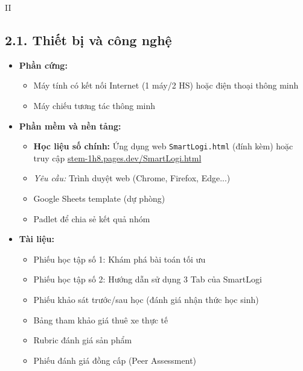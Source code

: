 \documentclass[12pt,a4paper]{article}
\begin{document}
\begin{competitionsection}{II}
\vspace{0.5cm}
\subsection*{2.1. Thiết bị và công nghệ}
\begin{itemize}[leftmargin=*,noitemsep]
\item \textbf{Phần cứng:}
    \begin{itemize}
    \item Máy tính có kết nối Internet (1 máy/2 HS) hoặc điện thoại thông minh
    \item Máy chiếu tương tác thông minh
    \end{itemize}
\item \textbf{Phần mềm và nền tảng:}
    \begin{itemize}
    \item \textbf{Học liệu số chính:} Ứng dụng web \texttt{SmartLogi.html} (đính kèm) hoặc truy cập \href{https://stem-1h8.pages.dev/SmartLogi.html}{stem-1h8.pages.dev/SmartLogi.html}
    \item \textit{Yêu cầu:} Trình duyệt web (Chrome, Firefox, Edge...)
    \item Google Sheets template (dự phòng)
    \item Padlet để chia sẻ kết quả nhóm
    \end{itemize}
\item \textbf{Tài liệu:}
    \begin{itemize}
    \item Phiếu học tập số 1: Khám phá bài toán tối ưu
    \item Phiếu học tập số 2: Hướng dẫn sử dụng 3 Tab của SmartLogi
    \item Phiếu khảo sát trước/sau học (đánh giá nhận thức học sinh)
    \item Bảng tham khảo giá thuê xe thực tế
    \item Rubric đánh giá sản phẩm
    \item Phiếu đánh giá đồng cấp (Peer Assessment)
    \end{itemize}
\end{itemize}


\end{competitionsection}
\end{document}
